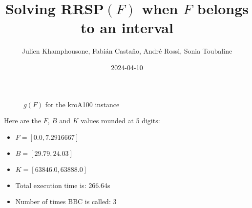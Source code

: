 \documentclass{article}
\begin{document}
     \title{Solving RRSP$(F)$ when $F$ belongs to an interval}
     \author{Julien Khamphousone, Fabi\'an Casta\~no, Andr\'e Rossi, Sonia Toubaline}
     \date{2024-04-10}
     \maketitle
     \def\F{{0.0,0.0729167,0.0802083}}
\def\gF{{638.46,640.6321875,63889.7521875}}
\begin{figure}[ht!]
    \begin{center}
    \end{center}
    \vspace*{-2eM}
    \caption{$g(F)$ for the kroA100 instance}\label{fig:1}
    \end{figure}
    Here are the $F$, $B$ and $K$ values rounded at 5 digits:

\begin{itemize}
	\item  $F = [0.0,7.2916667]$
 \item $B = [29.79,24.03]$
 \item  $K = [63846.0,63888.0]$\item Total execution time is: 266.64s\item Number of times BBC is called: 3\end{itemize}
\end{document}
